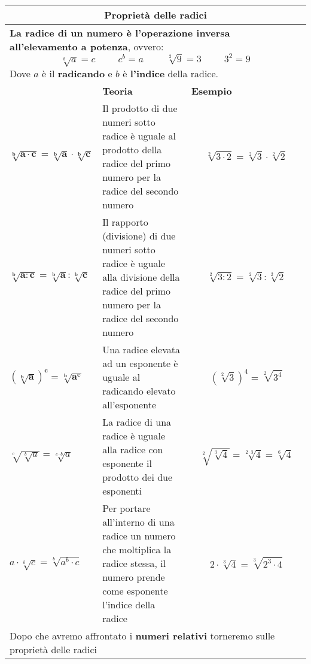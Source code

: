 \documentclass[14pt]{extarticle}
\begin{document}
\begin{table}
    \begin{tabular}{|m{0.3\linewidth}|m{0.3\linewidth}|m{0.4\linewidth}|}
        \hline
        \multicolumn{3}{|c|}{\large{\textbf{Proprietà delle radici}}}\\
        \hline
        \multicolumn{3}{|p{0.9\textwidth}|}{\textbf{La radice di un numero è l'operazione inversa all'elevamento a potenza}, ovvero: \[\sqrt[b]{a}=c \hspace{1cm} c^b=a   \hspace{1cm} \sqrt[2]{9}=3 \hspace{1cm} 3^2=9 \] Dove \(a\) è il \textbf{radicando} e \(b\) è \textbf{l'indice} della radice.}\\
        \hline
        \hline
         & \textbf{Teoria} & \textbf{Esempio }\\
        \hline
        \( \mathbf{\sqrt[b]{a\cdot c}=\sqrt[b]{a}\cdot\sqrt[b]{c}}\)& Il prodotto di due numeri sotto radice è uguale al prodotto della radice del primo numero per la radice del secondo numero & \[\sqrt[2]{3\cdot 2}=\sqrt[2]{3}\cdot\sqrt[2]{2}\]\\
        \hline
        \(\mathbf{\sqrt[b]{a:c}=\sqrt[b]{a}:\sqrt[b]{c}}\)& Il rapporto (divisione) di due numeri sotto radice è uguale alla divisione della radice del primo numero per la radice del secondo numero & \[\sqrt[2]{3: 2}=\sqrt[2]{3}:\sqrt[2]{2}\]\\
        \hline
        \(\mathbf{(\sqrt[b]{a})^c=\sqrt[b]{a^c}}\)& Una radice elevata ad un esponente è uguale al radicando elevato all'esponente & \[(\sqrt[2]{3})^4=\sqrt[2]{3^4}\]\\
        \hline
        \(\sqrt[c]{\sqrt[b]{a}}=\sqrt[c\cdot b]{a}\)& La radice di una radice è uguale alla radice con esponente il prodotto dei due esponenti & \[\sqrt[2]{\sqrt[3]{4}}=\sqrt[2\cdot 3]{4}=\sqrt[6]{4}\]\\
        \hline
        \(a\cdot\sqrt[b]{c}=\sqrt[b]{a^b\cdot c}\)& Per portare all'interno di una radice un numero che moltiplica la radice stessa, il numero prende come esponente l'indice della radice& \[2\cdot\sqrt[3]{4}=\sqrt[3]{2^3\cdot 4}\] \\
        \hline
        \hline
        \multicolumn{3}{|p{1\textwidth}|}{Dopo che avremo affrontato i \textbf{numeri relativi} torneremo sulle proprietà delle radici}\\
        \hline
        \hline
         
         \end{tabular}
\end{table}
         
\end{document}

